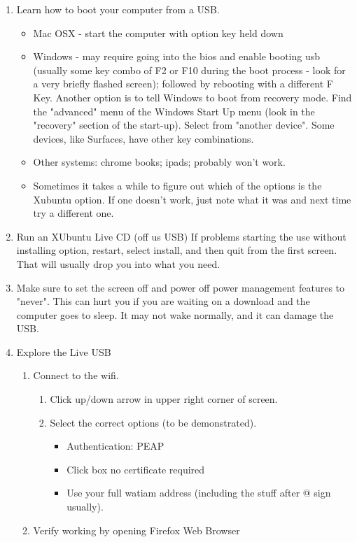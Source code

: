 \documentclass{article}
\begin{document}
\begin{enumerate}
\item Learn how to boot your computer from a USB. 
\begin{itemize}
\item Mac OSX - start the computer with option key held down
\item Windows - may require going into the bios and enable booting usb (usually some key combo of F2 or F10 during the boot process - look for a very briefly flashed screen); followed by rebooting with a different F Key. Another option is to tell Windows to boot from recovery mode. Find the "advanced" menu of the Windows Start Up menu (look in the "recovery" section of the start-up). Select from "another device". Some devices, like Surfaces, have other key combinations.
\item Other systems: chrome books; ipads; probably won't work.
\item Sometimes it takes a while to figure out which of the options is the Xubuntu option. If one doesn't work, just note what it was and next time try a different one.
\end{itemize}
\item Run an XUbuntu Live CD (off us USB)
If problems starting the use without installing option, restart, select install, and then quit from the first screen. That will usually drop you into what you need.
\item Make sure to set the screen off and power off power management features to "never". This can hurt you if you are waiting on a download and the computer goes to sleep. It may not wake normally, and it can damage the USB.
\item Explore the Live USB
\begin{enumerate}
\item Connect to the wifi.
\begin{enumerate}
\item Click up/down arrow in upper right corner of screen.
\item Select the correct options (to be demonstrated).
\begin{itemize}
\item Authentication: PEAP
\item Click box no certificate required
\item Use your full watiam address (including the stuff after @ sign usually).
\end{itemize}
\end{enumerate}
\item Verify working by opening Firefox Web Browser

\end{enumerate}
\end{enumerate}
\end{document}
